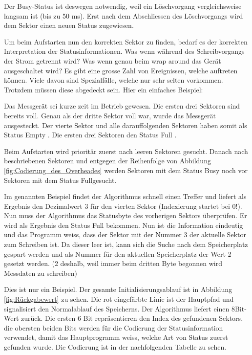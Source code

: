 Der Busy-Status ist deswegen notwendig, weil ein Löschvorgang vergleichsweise langsam ist (bis zu 50 ms). Erst nach dem Abschliessen des Löschvorgangs wird dem Sektor einen neuen Status zugewiesen.

Um beim Aufstarten nun den korrekten Sektor zu finden, bedarf es der korrekten Interpretation der Statusinformationen. Was wenn während des Schreibvorgangs der Strom getrennt wird? Was wenn genau beim \glqq wrap around \grqq  das Gerät ausgeschaltet wird? Es gibt eine grosse Zahl von Ereignissen, welche auftreten können. Viele davon sind Spezialfälle, welche nur sehr selten vorkommen. Trotzdem müssen diese abgedeckt sein. Hier ein einfaches Beispiel:

Das Messgerät sei kurze zeit im Betrieb gewesen. Die ersten drei Sektoren sind bereits voll. Genau als der dritte Sektor voll war, wurde das Messgerät ausgesteckt. Der vierte Sektor und alle darauffolgenden Sektoren haben somit als Status \glqq Empty \grqq . Die ersten drei Sektoren den Status  \glqq Full \grqq .

Beim Aufstarten wird prioritär zuerst nach leeren Sektoren gesucht. Danach nach beschriebenen Sektoren und entgegen der Reihenfolge von Abbildung \ref{fig:Codierung_des_Overheades} werden Sektoren mit dem Status \glqq Busy \grqq  noch vor Sektoren mit dem Status \glqq Full\grqq  gesucht.

Im genannten Beispiel findet der Algorithmus schnell einen Treffer und liefert als Ergebnis den Dezimalwert 3 für den vierten Sektor (Indexierung startet bei 0!). Nun muss der Algorithmus das Statusbyte des vorherigen Sektors überprüfen. Er wird als Ergebnis den Status \glqq Full \grqq  bekommen. Nun ist die Information eindeutig und das Programm weiss, dass der Sektor mit der Nummer 3 der aktuelle Sektor zum Schreiben ist. Da dieser leer ist, kann sich die Suche nach dem Speicherplatz gespart werden und als Nummer für den aktuellen Speicherplatz der Wert 2 gesetzt werden. (2 deshalb, weil immer beim dritten Byte begonnen wird Messdaten zu schreiben)

Dies ist nur ein Beispiel. Der gesamte Initialisierungsablauf ist in Abbildung \ref{fig:Rückgabewert} zu sehen. Die rot eingefärbte Linie ist der Hauptpfad und signalisiert den Normalablauf des Speicherns. Der Algorithmus liefert einen 8Bit-Wert zurück. Die ersten 6 Bit repräsentieren den Index des gefundenen Sektors, die obersten beiden Bits werden für die Codierung der Statusinformation verwendet, damit das Hauptprogramm weiss, welche Art von Status zuerst gefunden wurde. Die Codierung ist in der nachfolgenden Tabelle zu sehen.


